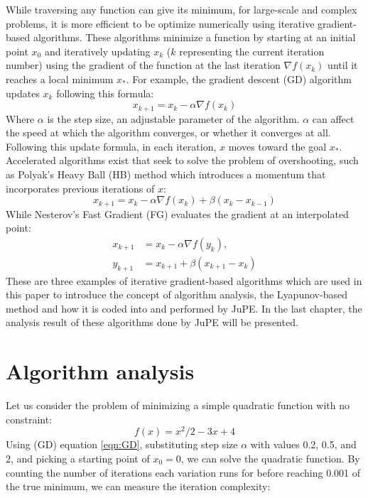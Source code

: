 While traversing any function can give its minimum, for large-scale and complex problems, it is more efficient to be optimize numerically using iterative gradient-based  algorithms. These algorithms minimize a function by starting at an initial point \(x_{0}\) and iteratively updating \(x_k\) (\(k\) representing the current iteration number) using the gradient of the function at the last iteration $\nabla f(x_k)$ until it reaches a local minimum \(x_*\). For example, the gradient descent (GD) algorithm updates \(x_k\) following this formula:
\begin{equation}\label{eqn:GD}
  x_{k+1}=x_{k}-\alpha \nabla f(x_k)
\end{equation}
Where $\alpha$ is the step size, an adjustable parameter of the algorithm. $\alpha$ can affect the speed at which the algorithm converges, or whether it converges at all. Following this update formula, in each iteration, \(x\) moves toward the goal \(x_*\). Accelerated algorithms exist that seek to solve the problem of overshooting, such as Polyak’s Heavy Ball (HB) method which introduces a momentum that incorporates previous iterations of \(x\):
\begin{equation}\label{eqn:HB}
  x_{k+1}=x_k-\alpha \nabla f(x_k)+ \beta (x_k-x_{k-1})
\end{equation}
While Nesterov’s Fast Gradient (FG) evaluates the gradient at an interpolated point:
\begin{subequations} \label{eqn:FG}
  \begin{align}
    x_{k+1}     &=x_k-\alpha \nabla f(y_k), \label{eq_state}       \\
    y_{k+1} &=x_{k+1}+\beta (x_{k+1}-x_k) \label{eq_interpolated point}
  \end{align}
  \end{subequations}
These are three examples of iterative gradient-based algorithms which are used in this paper to introduce the concept of algorithm analysis, the Lyapunov-based method and how it is coded into and performed by JuPE. In the last chapter, the analysis result of these algorithms done by JuPE will be presented.
\section{Algorithm analysis}
Let us consider the problem of minimizing a simple quadratic function with no constraint:
\begin{equation} \label{eqn:quadratic}
    f(x) = x^2/2 - 3x + 4
\end{equation}
Using (GD) equation \ref{eqn:GD}, substituting step size $\alpha$ with values 0.2, 0.5, and 2, and picking a starting point of $x_0 = 0$, we can solve the quadratic function. By counting the number of iterations each variation runs for before reaching 0.001 of the true minimum, we can measure the iteration complexity:

